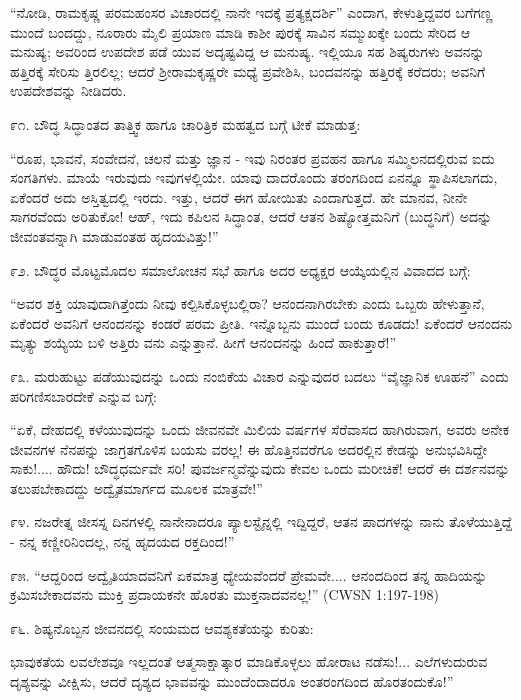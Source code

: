 “ನೋಡಿ, ರಾಮಕೃಷ್ಣ ಪರಮಹಂಸರ ವಿಚಾರದಲ್ಲಿ ನಾನೇ ಇದಕ್ಕೆ ಪ್ರತ್ಯಕ್ಷದರ್ಶಿ” ಎಂದಾಗ, ಕೇಳುತ್ತಿದ್ದವರ ಬಗೆಗಣ್ಣ ಮುಂದೆ ಬಂದದ್ದು, ನೂರಾರು ಮೈಲಿ ಪ್ರಯಾಣ ಮಾಡಿ ಕಾಶೀ ಪುರಕ್ಕೆ ಸಾವಿನ ಸಮ್ಮುಖಕ್ಕೇ ಬಂದು ಸೇರಿದ ಆ ಮನುಷ್ಯ; ಅವರಿಂದ ಉಪದೇಶ ಪಡೆ ಯುವ ಅದೃಷ್ಟವಿದ್ದ ಆ ಮನುಷ್ಯ. ಇಲ್ಲಿಯೂ ಸಹ ಶಿಷ್ಯರುಗಳು ಅವನನ್ನು ಹತ್ತಿರಕ್ಕೆ ಸೇರಿಸು ತ್ತಿರಲಿಲ್ಲ; ಆದರೆ ಶ‍್ರೀರಾಮಕೃಷ್ಣರೇ ಮಧ್ಯೆ ಪ್ರವೇಶಿಸಿ, ಬಂದವನನ್ನು ಹತ್ತಿರಕ್ಕೆ ಕರೆದರು; ಅವನಿಗೆ ಉಪದೇಶವನ್ನು ನೀಡಿದರು. 

೯೧. ಬೌದ್ಧ ಸಿದ್ಧಾಂತದ ತಾತ್ತ್ವಿಕ ಹಾಗೂ ಚಾರಿತ್ರಿಕ ಮಹತ್ವದ ಬಗ್ಗೆ ಟೀಕೆ ಮಾಡುತ್ತ:

“ರೂಪ, ಭಾವನೆ, ಸಂವೇದನೆ, ಚಲನೆ ಮತ್ತು ಜ್ಞಾನ - ಇವು ನಿರಂತರ ಪ್ರವಹನ ಹಾಗೂ ಸಮ್ಮಿಲನದಲ್ಲಿರುವ ಐದು ಸಂಗತಿಗಳು. ಮಾಯೆ ಇರುವುದು ಇವುಗಳಲ್ಲಿಯೇ. ಯಾವು ದಾದರೊಂದು ತರಂಗದಿಂದ ಏನನ್ನೂ ಸ್ಥಾಪಿಸಲಾಗದು, ಏಕೆಂದರೆ ಅದು ಅಸ್ತಿತ್ವದಲ್ಲಿ ಇರದು. ಇತ್ತು, ಆದರೆ ಈಗ ಹೋಯಿತು ಎಂದಾಗುತ್ತದೆ. ಹೇ ಮಾನವ, ನೀನೇ ಸಾಗರವೆಂದು ಅರಿತುಕೋ! ಆಹ್, ಇದು ಕಪಿಲನ ಸಿದ್ಧಾಂತ, ಆದರೆ ಆತನ ಶಿಷ್ಯೋತ್ತಮನಿಗೆ (ಬುದ್ಧನಿಗೆ) ಅದನ್ನು ಜೀವಂತವನ್ನಾಗಿ ಮಾಡುವಂತಹ ಹೃದಯವಿತ್ತು!” 

೯೨. ಬೌದ್ಧರ ಮೊಟ್ಟಮೊದಲ ಸಮಾಲೋಚನ ಸಭೆ ಹಾಗೂ ಅದರ ಅಧ್ಯಕ್ಷರ ಆಯ್ಕೆಯಲ್ಲಿನ ವಿವಾದದ ಬಗ್ಗೆ:

“ಅವರ ಶಕ್ತಿ ಯಾವುದಾಗಿತ್ತೆಂದು ನೀವು ಕಲ್ಪಿಸಿಕೊಳ್ಳಬಲ್ಲಿರಾ? ಆನಂದನಾಗಿರಬೇಕು ಎಂದು ಒಬ್ಬರು ಹೇಳುತ್ತಾನೆ, ಏಕೆಂದರೆ ಅವನಿಗೆ ಆನಂದನನ್ನು ಕಂಡರೆ ಪರಮ ಪ್ರೀತಿ. ಇನ್ನೊಬ್ಬನು ಮುಂದೆ ಬಂದು ಕೂಡದು! ಏಕೆಂದರೆ ಆನಂದನು ಮೃತ್ಯು ಶಯ್ಯೆಯ ಬಳಿ ಅತ್ತಿರು ವನು ಎನ್ನುತ್ತಾನೆ. ಹೀಗೆ ಆನಂದನನ್ನು ಹಿಂದೆ ಹಾಕುತ್ತಾರೆ!” 

೯೩. ಮರುಹುಟ್ಟು ಪಡೆಯುವುದನ್ನು ಒಂದು ನಂಬಿಕೆಯ ವಿಚಾರ ಎನ್ನುವುದರ ಬದಲು “ವೈಜ್ಞಾನಿಕ ಊಹನೆ” ಎಂದು ಪರಿಗಣಿಸಬಾರದೇಕೆ ಎನ್ನುವ ಬಗ್ಗೆ:

“ಏಕೆ, ದೇಹದಲ್ಲಿ ಕಳೆಯುವುದನ್ನು ಒಂದು ಜೀವನವೇ ಮಿಲಿಯ ವರ್ಷಗಳ ಸೆರೆವಾಸದ ಹಾಗಿರುವಾಗ, ಅವರು ಅನೇಕ ಜೀವನಗಳ ನೆನಪನ್ನು ಜಾಗ್ರತಗೊಳಿಸ ಬಯಸು ವರಲ್ಲ! ಈ ಹೊತ್ತಿನವರೆಗೂ ಅದರಲ್ಲಿನ ಕೇಡನ್ನು ಅನುಭವಿಸಿದ್ದೇ ಸಾಕು!.... ಹೌದು! ಬೌದ್ಧಧರ್ಮವೇ ಸರಿ! ಪುವರ್ಜನ್ಮವೆನ್ನುವುದು ಕೇವಲ ಒಂದು ಮರೀಚಿಕೆ! ಆದರೆ ಈ ದರ್ಶನವನ್ನು ತಲುಪಬೇಕಾದದ್ದು ಅದ್ವೈತಮಾರ್ಗದ ಮೂಲಕ ಮಾತ್ರವೇ!” 

೯೪. ನಜರೇತ್ನ ಜೀಸಸ್ನ ದಿನಗಳಲ್ಲಿ ನಾನೇನಾದರೂ ಪ್ಯಾಲಸ್ಟೈನ್ನಲ್ಲಿ ಇದ್ದಿದ್ದರೆ, ಆತನ ಪಾದಗಳನ್ನು ನಾನು ತೊಳೆಯುತ್ತಿದ್ದೆ - ನನ್ನ ಕಣ್ಣೀರಿನಿಂದಲ್ಲ, ನನ್ನ ಹೃದಯದ ರಕ್ತದಿಂದ!” 

೯೫. “ಆದ್ದರಿಂದ ಅದ್ವೈತಿಯಾದವನಿಗೆ ಏಕಮಾತ್ರ ಧ್ಯೇಯವೆಂದರೆ ಪ್ರೇಮವೇ.... ಆನಂದದಿಂದ ತನ್ನ ಹಾದಿಯನ್ನು ಕ್ರಮಿಸಬೇಕಾದವನು ಮುಕ್ತಿ ಪ್ರದಾಯಕನೇ ಹೊರತು ಮುಕ್ತನಾದವನಲ್ಲ!” (CWSN 1:197-198)

೯೬. ಶಿಷ್ಯನೊಬ್ಬನ ಜೀವನದಲ್ಲಿ ಸಂಯಮದ ಆವಶ್ಯಕತೆಯನ್ನು ಕುರಿತು:

ಭಾವುಕತೆಯ ಲವಲೇಶವೂ ಇಲ್ಲದಂತೆ ಆತ್ಮಸಾಕ್ಷಾತ್ಕಾರ ಮಾಡಿಕೊಳ್ಳಲು ಹೋರಾಟ ನಡೆಸು!... ಎಲೆಗಳುದುರುವ ದೃಶ್ಯವನ್ನು ವೀಕ್ಷಿಸು, ಆದರೆ ದೃಶ್ಯದ ಭಾವವನ್ನು ಮುಂದೆಂದಾದರೂ ಅಂತರಂಗದಿಂದ ಹೊರತಂದುಕೊ!” 

